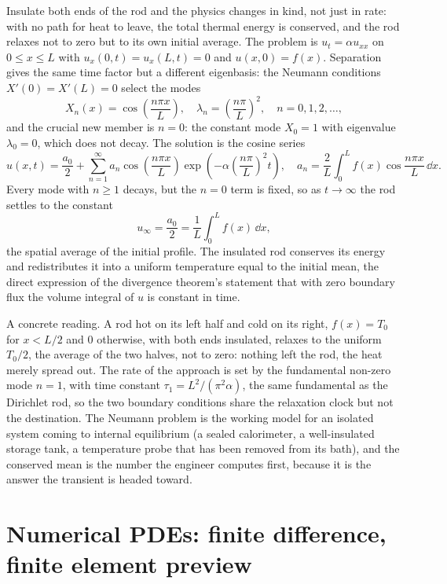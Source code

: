 Insulate both ends of the rod and the physics changes in kind, not
just in rate: with no path for heat to leave, the total thermal energy
is conserved, and the rod relaxes not to zero but to its own initial
average. The problem is $u_{t} = \alpha u_{xx}$ on $0 \leq x \leq L$
with $u_{x}(0, t) = u_{x}(L, t) = 0$ and $u(x, 0) = f(x)$. Separation
gives the same time factor but a different eigenbasis: the Neumann
conditions $X'(0) = X'(L) = 0$ select the  modes
\[
X_{n}(x) = \cos\!\left(\frac{n\pi x}{L}\right), \quad
\lambda_{n} = \left(\frac{n\pi}{L}\right)^{2}, \quad n = 0, 1, 2, \ldots,
\]
and the crucial new member is $n = 0$: the constant mode $X_{0} = 1$
with eigenvalue $\lambda_{0} = 0$, which does not decay. The solution
is the cosine series
\[
u(x, t) = \frac{a_{0}}{2} + \sum_{n=1}^{\infty} a_{n}
\cos\!\left(\frac{n\pi x}{L}\right)
\exp\!\left(-\alpha\left(\frac{n\pi}{L}\right)^{2}t\right),
\quad
a_{n} = \frac{2}{L}\int_{0}^{L} f(x)\cos\frac{n\pi x}{L}\,\dd x.
\]
Every mode with $n \geq 1$ decays, but the $n = 0$ term is fixed, so
as $t \to \infty$ the rod settles to the constant
\[
u_{\infty} = \frac{a_{0}}{2} = \frac{1}{L}\int_{0}^{L} f(x)\,\dd x,
\]
the spatial average of the initial profile. The insulated rod
conserves its energy and redistributes it into a uniform temperature
equal to the initial mean, the direct expression of the divergence
theorem's statement that with zero boundary flux the volume integral
of $u$ is constant in time.

A concrete reading. A rod hot on its left half and cold on its right,
$f(x) = T_{0}$ for $x < L/2$ and $0$ otherwise, with both ends
insulated, relaxes to the uniform $T_{0}/2$, the average of the two
halves, not to zero: nothing left the rod, the heat merely spread
out. The rate of the approach is set by the fundamental non-zero mode
$n = 1$, with time constant $\tau_{1} = L^{2}/(\pi^{2}\alpha)$, the
same fundamental as the Dirichlet rod, so the two boundary conditions
share the relaxation clock but not the destination. The Neumann
problem is the working model for an isolated system coming to internal
equilibrium (a sealed calorimeter, a well-insulated storage tank, a
temperature probe that has been removed from its bath), and the
conserved mean is the number the engineer computes first, because it
is the answer the transient is headed toward.

\section{Numerical PDEs: finite difference, finite element preview}

